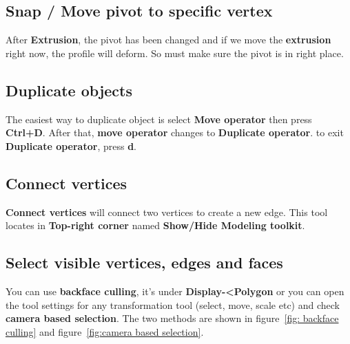 \subsection{Snap / Move pivot to specific vertex}
After \textbf{Extrusion}, the pivot has been changed and if we move the \textbf{extrusion} right now, the profile will deform. So must make sure the pivot is in right place.

\subsection{Duplicate objects}
The easiest way to duplicate object is select \textbf{Move operator} then press \textbf{Ctrl+D}. After that, \textbf{move operator} changes to \textbf{Duplicate operator}. to exit \textbf{Duplicate operator}, press \textbf{d}.

\subsection{Connect vertices}
\textbf{Connect vertices} will connect two vertices to create a new edge. This tool locates in \textbf{Top-right corner} named \textbf{Show/Hide Modeling toolkit}.

\subsection{Select visible vertices, edges and faces}
You can use \textbf{backface culling}, it's under \textbf{Display-\textless Polygon} or you can open the tool settings for any transformation tool (select, move, scale etc) and check \textbf{camera based selection}. The two methods are shown in figure~\ref{fig: backface culling} and figure~\ref{fig:camera based selection}.

